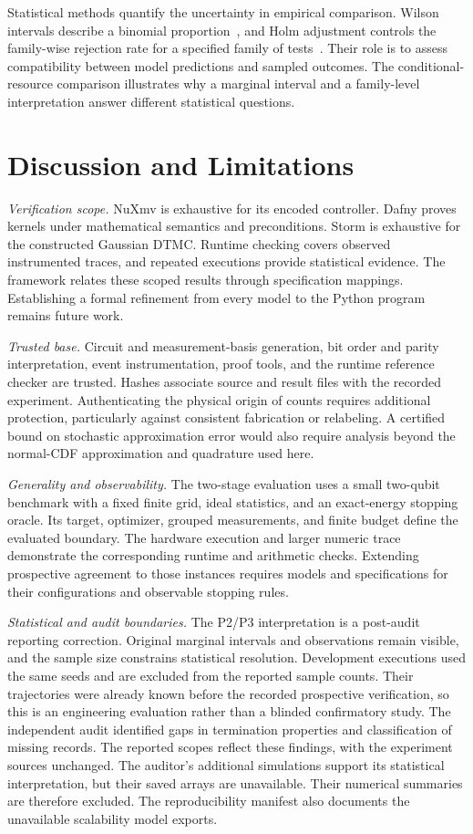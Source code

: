 \documentclass[conference]{IEEEtran}
\begin{document}
Statistical methods quantify the uncertainty in empirical comparison. Wilson intervals describe a binomial proportion~\cite{wilson}, and Holm adjustment controls the family-wise rejection rate for a specified family of tests~\cite{holm}. Their role is to assess compatibility between model predictions and sampled outcomes. The conditional-resource comparison illustrates why a marginal interval and a family-level interpretation answer different statistical questions.

\section{Discussion and Limitations}
\label{sec:limitations}
\emph{Verification scope.} NuXmv is exhaustive for its encoded controller. Dafny proves kernels under mathematical semantics and preconditions. Storm is exhaustive for the constructed Gaussian DTMC. Runtime checking covers observed instrumented traces, and repeated executions provide statistical evidence. The framework relates these scoped results through specification mappings. Establishing a formal refinement from every model to the Python program remains future work.

\emph{Trusted base.} Circuit and measurement-basis generation, bit order and parity interpretation, event instrumentation, proof tools, and the runtime reference checker are trusted. Hashes associate source and result files with the recorded experiment. Authenticating the physical origin of counts requires additional protection, particularly against consistent fabrication or relabeling. A certified bound on stochastic approximation error would also require analysis beyond the normal-CDF approximation and quadrature used here.

\emph{Generality and observability.} The two-stage evaluation uses a small two-qubit benchmark with a fixed finite grid, ideal statistics, and an exact-energy stopping oracle. Its target, optimizer, grouped measurements, and finite budget define the evaluated boundary. The hardware execution and larger numeric trace demonstrate the corresponding runtime and arithmetic checks. Extending prospective agreement to those instances requires models and specifications for their configurations and observable stopping rules.

\emph{Statistical and audit boundaries.} The P2/P3 interpretation is a post-audit reporting correction. Original marginal intervals and observations remain visible, and the sample size constrains statistical resolution. Development executions used the same seeds and are excluded from the reported sample counts. Their trajectories were already known before the recorded prospective verification, so this is an engineering evaluation rather than a blinded confirmatory study. The independent audit identified gaps in termination properties and classification of missing records. The reported scopes reflect these findings, with the experiment sources unchanged. The auditor's additional simulations support its statistical interpretation, but their saved arrays are unavailable. Their numerical summaries are therefore excluded. The reproducibility manifest also documents the unavailable scalability model exports.
\end{document}
